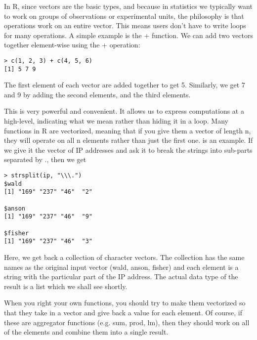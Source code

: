In R, since vectors are the basic types, and because in statistics we
typically want to work on groups of observations or experimental
units, the philosophy is that operations work on an entire
vector. This means users don't have to write loops for many
operations. A simple example is the + function. We can add two vectors
together element-wise using the + operation:
\begin{verbatim}
> c(1, 2, 3) + c(4, 5, 6)
[1] 5 7 9
\end{verbatim}
The first element of each vector are added together to get
5. Similarly, we get 7 and 9 by adding the second elements, and the
third elements.

This is very powerful and convenient. It allows us to express
computations at a high-level, indicating what we mean rather than
hiding it in a loop. Many functions in R are vectorized, meaning that
if you give them a vector of length n, they will operate on all n
elements rather than just the first one.  is an
example. If we give it the vector of IP addresses and ask it to break
the strings into sub-parts separated by ., then we get
\begin{verbatim}
> strsplit(ip, "\\\.")
$wald
[1] "169" "237" "46"  "2"  

$anson
[1] "169" "237" "46"  "9"  

$fisher
[1] "169" "237" "46"  "3"  
\end{verbatim}
Here, we get back a collection of character vectors. The collection
has the same names as the original input vector (wald, anson, fisher)
and each element is a string with the particular part of the IP
address. The actual data type of the result is a list which we shall
see shortly.

When you right your own functions, you should try to make them
vectorized so that they take in a vector and give back a value for
each element. Of course, if these are aggregator functions (e.g. sum,
prod, lm), then they should work on all of the elements and combine
them into a single result.


